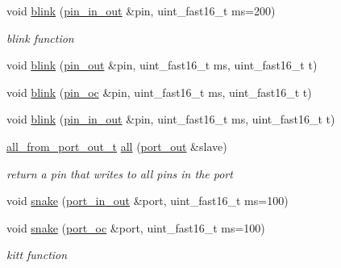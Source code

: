 \begin{DoxyCompactItemize}
void \hyperlink{namespacehwlib_a76528f4237960700ba546384da8d493d}{blink} (\hyperlink{classhwlib_1_1pin__in__out}{pin\+\_\+in\+\_\+out} \&pin, uint\+\_\+fast16\+\_\+t ms=200)
\begin{DoxyCompactList}\small\item\em blink function \end{DoxyCompactList}\item 
void \hyperlink{namespacehwlib_ab23acad933a5226df042258d51580e12}{blink} (\hyperlink{classhwlib_1_1pin__out}{pin\+\_\+out} \&pin, uint\+\_\+fast16\+\_\+t ms, uint\+\_\+fast16\+\_\+t t)
\item 
void \hyperlink{namespacehwlib_a15c7dfa69658f68b4c264274f88cfa07}{blink} (\hyperlink{classhwlib_1_1pin__oc}{pin\+\_\+oc} \&pin, uint\+\_\+fast16\+\_\+t ms, uint\+\_\+fast16\+\_\+t t)
\item 
void \hyperlink{namespacehwlib_a7a664ac66df071c75f502006e184101c}{blink} (\hyperlink{classhwlib_1_1pin__in__out}{pin\+\_\+in\+\_\+out} \&pin, uint\+\_\+fast16\+\_\+t ms, uint\+\_\+fast16\+\_\+t t)
\item 
\mbox{\label{namespacehwlib_acf19508f1fedc022e59b834d9cf5c3cd}} 
\hyperlink{classhwlib_1_1all__from__port__out__t}{all\+\_\+from\+\_\+port\+\_\+out\+\_\+t} \hyperlink{namespacehwlib_acf19508f1fedc022e59b834d9cf5c3cd}{all} (\hyperlink{classhwlib_1_1port__out}{port\+\_\+out} \&slave)
\begin{DoxyCompactList}\small\item\em return a pin that writes to all pins in the port \end{DoxyCompactList}\item 
void \hyperlink{namespacehwlib_afec6df9d280b36f3c7f43ffb607edd92}{snake} (\hyperlink{classhwlib_1_1port__in__out}{port\+\_\+in\+\_\+out} \&port, uint\+\_\+fast16\+\_\+t ms=100)
\item 
void \hyperlink{namespacehwlib_a7e2fef74b1e48c7ae225d7b2a7b2935f}{snake} (\hyperlink{classhwlib_1_1port__oc}{port\+\_\+oc} \&port, uint\+\_\+fast16\+\_\+t ms=100)
\begin{DoxyCompactList}\small\item\em kitt function \end{DoxyCompactList}\end{DoxyCompactItemize}
\textbf{ }\par
